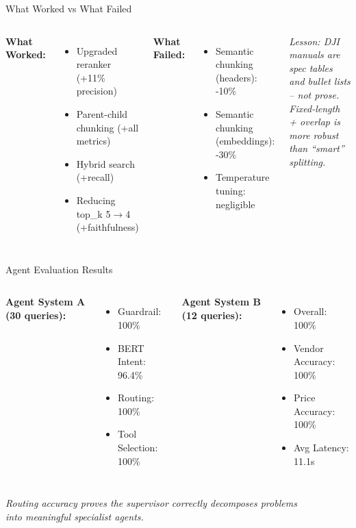 \documentclass[aspectratio=169]{beamer}
\begin{document}
\begin{frame}{What Worked vs What Failed}
\begin{columns}
\textbf{What Worked:}
\begin{itemize}
  \item Upgraded reranker (+11\% precision)
  \item Parent-child chunking (+all metrics)
  \item Hybrid search (+recall)
  \item Reducing top\_k 5$\rightarrow$4 (+faithfulness)
\end{itemize}

\textbf{What Failed:}
\begin{itemize}
  \item Semantic chunking (headers): -10\%
  \item Semantic chunking (embeddings): -30\%
  \item Temperature tuning: negligible
\end{itemize}

\vspace{0.5em}
\small\textit{Lesson: DJI manuals are spec tables and bullet lists -- not prose. Fixed-length + overlap is more robust than ``smart'' splitting.}
\end{columns}
\end{frame}

\begin{frame}{Agent Evaluation Results}
\begin{columns}
\textbf{Agent System A (30 queries):}
\begin{itemize}
  \item Guardrail: 100\%
  \item BERT Intent: 96.4\%
  \item Routing: 100\%
  \item Tool Selection: 100\%
\end{itemize}

\textbf{Agent System B (12 queries):}
\begin{itemize}
  \item Overall: 100\%
  \item Vendor Accuracy: 100\%
  \item Price Accuracy: 100\%
  \item Avg Latency: 11.1s
\end{itemize}
\end{columns}

\vspace{1em}
\centering
\small\textit{Routing accuracy proves the supervisor correctly decomposes problems\\into meaningful specialist agents.}
\end{frame}
\end{document}
